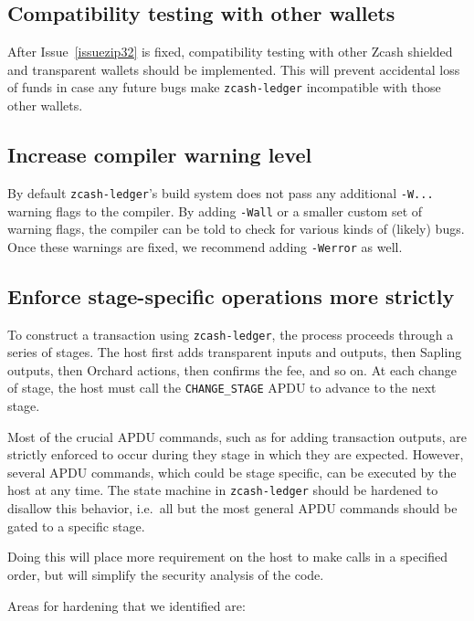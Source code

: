 \documentclass[10pt,titlepage]{article}
\begin{document}
\subsection{Compatibility testing with other wallets}

After Issue~\ref{issuezip32} is fixed, compatibility testing with other Zcash
shielded and transparent wallets should be implemented. This will prevent
accidental loss of funds in case any future bugs make \texttt{zcash-ledger}
incompatible with those other wallets.

\subsection{Increase compiler warning level} \label{recwarninglevel}

By default \texttt{zcash-ledger}'s build system does not pass any additional
\texttt{-W...} warning flags to the compiler. By adding \texttt{-Wall} or a
smaller custom set of warning flags, the compiler can be told to check for
various kinds of (likely) bugs. Once these warnings are fixed, we recommend
adding \texttt{-Werror} as well.

\subsection{Enforce stage-specific operations more strictly} \label{recmultiplefeeconfs}

To construct a transaction using \texttt{zcash-ledger}, the process proceeds
through a series of stages. The host first adds transparent inputs and outputs,
then Sapling outputs, then Orchard actions, then confirms the fee, and so on. At
each change of stage, the host must call the \texttt{CHANGE\_STAGE} APDU to
advance to the next stage.

Most of the crucial APDU commands, such as for adding transaction outputs, are
strictly enforced to occur during they stage in which they are expected.
However, several APDU commands, which could be stage specific, can be executed
by the host at any time. The state machine in \texttt{zcash-ledger} should be
hardened to disallow this behavior, i.e.\ all but the most general APDU commands
should be gated to a specific stage.

Doing this will place more requirement on the host to make calls in a specified
order, but will simplify the security analysis of the code.

Areas for hardening that we identified are:
\end{document}
